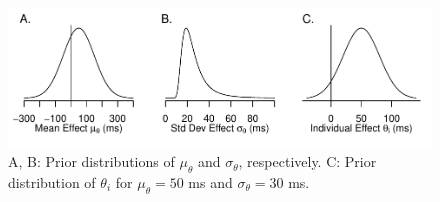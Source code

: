 \documentclass[
  ,man]{apa6}
\begin{document}
\begin{figure}
\centering
\includegraphics{p_files/figure-latex/theta-1.pdf}
\caption{\label{fig:theta}A, B: Prior distributions of \(\mu_\theta\) and \(\sigma_\theta\), respectively. C: Prior distribution of \(\theta_i\) for \(\mu_\theta=50\) ms and \(\sigma_\theta=30\) ms.}
\end{figure}

\begin{table}[tbp]

\begin{center}
\begin{threeparttable}

\caption{\label{tab:metaTab}}


\end{threeparttable}
\end{center}
\end{table}
\end{document}
